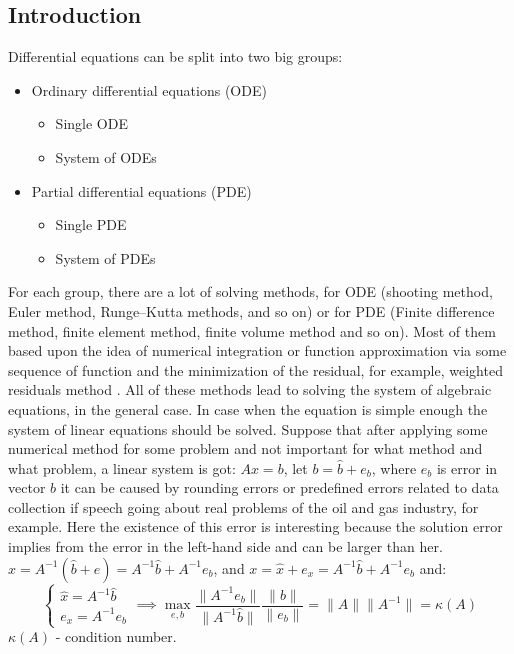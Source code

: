 \subsection{Introduction}
Differential equations can be split into two big groups:
\begin{itemize}
	\item Ordinary differential equations (ODE)
	\begin{itemize}
		\setlength\itemsep{0.5em}
		\item Single ODE
		\item System of ODEs
	\end{itemize}
	\item Partial differential equations (PDE)
	\begin{itemize}
		\setlength\itemsep{0.5em}
		\item Single PDE
		\item System of PDEs
	\end{itemize}
\end{itemize}
For each group, there are a lot of solving methods, for ODE (shooting method, Euler method, Runge–Kutta methods, and so on) or for PDE (Finite difference method, finite element method, finite volume method and so on). Most of them based upon the idea of numerical integration or function approximation via some sequence of function and the minimization of the residual, for example, weighted residuals method \cite{finlayson2013method} \cite{fletcher2012computational}. All of these methods lead to solving the system of algebraic equations, in the general case. In case when the equation is simple enough the system of linear equations should be solved. Suppose that after applying some numerical method for some problem and not important for what method and what problem, a linear system is got: 
$A x = b$, let $b = \hat{b} + e_b $, where $e_b$ is error in vector $b$ it can be caused by rounding errors or predefined errors related to data collection if speech going about real problems of the oil and gas industry, for example. Here the existence of this error is interesting because the solution error implies from the error in the left-hand side and can be larger than her. $x = A^{-1} (\hat{b} + e) = A^{-1} \hat{b} + A^{-1} e_b$, and $x = \hat{x} + e_x = A^{-1} \hat{b} + A^{-1} e_b$ and:
\begin{equation*}
	\begin{cases}
		\hat{x} = A^{-1} \hat{b} \\
		e_x = A^{-1} e_b
	\end{cases} \implies \max_{e, b} \dfrac{\|A^{-1} e_b\|}{\|A^{-1} \hat{b} \|} \dfrac{\|b\|}{\|e_b\|} = \| A \| \| A^{-1} \| = \kappa(A)
\end{equation*}
$\kappa(A)$ - condition number\cite{gentle2007matrix}. 

